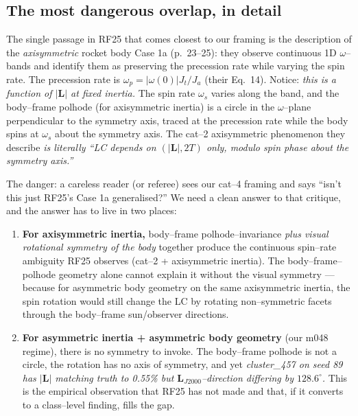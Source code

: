 \documentclass[11pt]{article}
\newcommand{\Lvec}{\mathbf{L}}
\newcommand{\LJ}{\Lvec_{J2000}}
\begin{document}
\subsection{The most dangerous overlap, in detail}

\noindent
The single passage in RF25 that comes closest to our framing is the
description of the \emph{axisymmetric} rocket body Case 1a (p.~23--25):
they observe continuous 1D $\omega$--bands and identify them as preserving
the precession rate while varying the spin rate. The precession rate is
$\omega_p = |\omega(0)| J_t / J_a$ (their Eq.~14). Notice: \emph{this is a
function of $|\Lvec|$ at fixed inertia.} The spin rate $\omega_s$ varies
along the band, and the body--frame polhode (for axisymmetric inertia) is
a circle in the $\omega$--plane perpendicular to the symmetry axis, traced at
the precession rate while the body spins at $\omega_s$ about the symmetry
axis. The cat--2 axisymmetric phenomenon they describe \emph{is literally
``LC depends on $(|\Lvec|, 2T)$ only, modulo spin phase about the symmetry
axis.''}

The danger: a careless reader (or referee) sees our cat--4 framing and
says ``isn't this just RF25's Case 1a generalised?'' We need a clean answer
to that critique, and the answer has to live in two places:

\begin{enumerate}
\item \textbf{For axisymmetric inertia,} body--frame polhode--invariance
\emph{plus visual rotational symmetry of the body} together produce
the continuous spin--rate ambiguity RF25 observes (cat--2 + axisymmetric
inertia). The body--frame--polhode geometry alone cannot explain it
without the visual symmetry --- because for asymmetric body geometry on
the same axisymmetric inertia, the spin rotation would still change the
LC by rotating non--symmetric facets through the body--frame
sun/observer directions.

\item \textbf{For asymmetric inertia + asymmetric body geometry} (our
m048 regime), there is no symmetry to invoke. The body--frame polhode is
not a circle, the rotation has no axis of symmetry, and yet
\emph{cluster\_457 on seed 89 has $|\Lvec|$ matching truth to 0.55\%
but $\LJ$--direction differing by $128.6^\circ$.} This is the empirical
observation that RF25 has not made and that, if it converts to a
class--level finding, fills the gap.
\end{enumerate}
\end{document}
